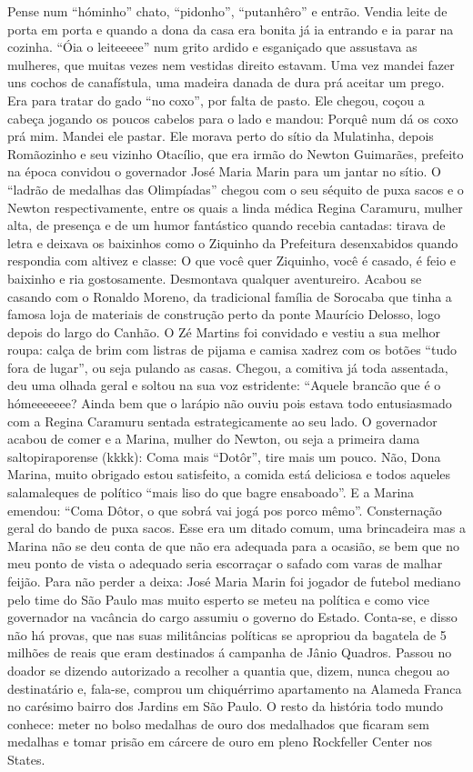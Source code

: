 \documentclass[12pt,brazil,]{book}
\begin{document}
Pense num ``hóminho'' chato, ``pidonho'', ``putanhêro'' e entrão. Vendia
leite de porta em porta e quando a dona da casa era bonita já ia
entrando e ia parar na cozinha. ``Óia o leiteeeee'' num grito ardido e
esganiçado que assustava as mulheres, que muitas vezes nem vestidas
direito estavam. Uma vez mandei fazer uns cochos de canafístula, uma
madeira danada de dura prá aceitar um prego. Era para tratar do gado
``no coxo'', por falta de pasto. Ele chegou, coçou a cabeça jogando os
poucos cabelos para o lado e mandou: Porquê num dá os coxo prá mim.
Mandei ele pastar. Ele morava perto do sítio da Mulatinha, depois
Romãozinho e seu vizinho Otacílio, que era irmão do Newton Guimarães,
prefeito na época convidou o governador José Maria Marin para um jantar
no sítio. O ``ladrão de medalhas das Olimpíadas'' chegou com o seu
séquito de puxa sacos e o Newton respectivamente, entre os quais a linda
médica Regina Caramuru, mulher alta, de presença e de um humor
fantástico quando recebia cantadas: tirava de letra e deixava os
baixinhos como o Ziquinho da Prefeitura desenxabidos quando respondia
com altivez e classe: O que você quer Ziquinho, você é casado, é feio e
baixinho e ria gostosamente. Desmontava qualquer aventureiro. Acabou se
casando com o Ronaldo Moreno, da tradicional família de Sorocaba que
tinha a famosa loja de materiais de construção perto da ponte Maurício
Delosso, logo depois do largo do Canhão. O Zé Martins foi convidado e
vestiu a sua melhor roupa: calça de brim com listras de pijama e camisa
xadrez com os botões ``tudo fora de lugar'', ou seja pulando as casas.
Chegou, a comitiva já toda assentada, deu uma olhada geral e soltou na
sua voz estridente: ``Aquele brancão que é o hómeeeeeee? Ainda bem que o
larápio não ouviu pois estava todo entusiasmado com a Regina Caramuru
sentada estrategicamente ao seu lado. O governador acabou de comer e a
Marina, mulher do Newton, ou seja a primeira dama saltopiraporense
(kkkk): Coma mais ``Dotôr'', tire mais um pouco. Não, Dona Marina, muito
obrigado estou satisfeito, a comida está deliciosa e todos aqueles
salamaleques de político ``mais liso do que bagre ensaboado''. E a
Marina emendou: ``Coma Dôtor, o que sobrá vai jogá pos porco mêmo''.
Consternação geral do bando de puxa sacos. Esse era um ditado comum, uma
brincadeira mas a Marina não se deu conta de que não era adequada para a
ocasião, se bem que no meu ponto de vista o adequado seria escorraçar o
safado com varas de malhar feijão. Para não perder a deixa: José Maria
Marin foi jogador de futebol mediano pelo time do São Paulo mas muito
esperto se meteu na política e como vice governador na vacância do cargo
assumiu o governo do Estado. Conta-se, e disso não há provas, que nas
suas militâncias políticas se apropriou da bagatela de 5 milhões de
reais que eram destinados á campanha de Jânio Quadros. Passou no doador
se dizendo autorizado a recolher a quantia que, dizem, nunca chegou ao
destinatário e, fala-se, comprou um chiquérrimo apartamento na Alameda
Franca no carésimo bairro dos Jardins em São Paulo. O resto da história
todo mundo conhece: meter no bolso medalhas de ouro dos medalhados que
ficaram sem medalhas e tomar prisão em cárcere de ouro em pleno
Rockfeller Center nos States.
\end{document}
